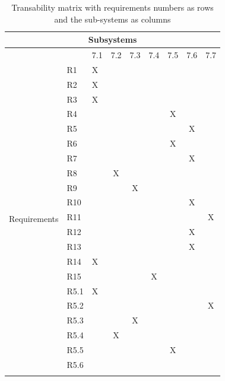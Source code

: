 \documentclass[hidelinks, 12pt, a4paper]{article}
\begin{document}
\begin{table}[H]
    \centering
        \begin{tabular}{|l|l|l|c|c|c|c|c|c|}
        \hline
    
            \multicolumn{9}{|c|}{Subsystems} \\ \hline
            &      & 7.1  & 7.2   & 7.3 & 7.4 & 7.5 & 7.6  &7.7 \\ \hline
        \multirow{22}{*}{Requirements}
        & R1    &   X   &       &      &    &      &   &    \\ \cline{2-9} 
        & R2    &   X   &       &      &    &      &   &    \\ \cline{2-9} 
        & R3    &   X   &       &      &    &      &   &    \\ \cline{2-9} 
        & R4    &       &       &      &    &   X  &   &     \\ \cline{2-9}
        & R5    &       &       &      &    &      & X &    \\ \cline{2-9}
        & R6    &       &       &      &    &   X  &   &    \\ \cline{2-9}
        & R7    &       &       &      &    &      & X &    \\ \cline{2-9}
        & R8    &       &   X   &      &    &      &   &    \\ \cline{2-9}
        & R9    &       &       &   X  &    &      &   &    \\ \cline{2-9}
        & R10   &       &       &      &    &      & X &    \\ \cline{2-9}
        & R11   &       &       &      &    &      &   &  X  \\ \cline{2-9}
        & R12   &       &       &      &    &      & X &     \\ \cline{2-9}
        & R13   &       &       &      &    &      & X &     \\ \cline{2-9}
        & R14   &   X   &       &      &    &      &   &    \\ \cline{2-9}
        & R15   &       &       &      &  X &      &   &    \\ \cline{2-9}
        & R5.1  &   X   &       &      &    &      &   &    \\ \cline{2-9}
        & R5.2  &       &       &      &    &      &   &  X  \\ \cline{2-9}
        & R5.3  &       &       &  X   &    &      &   &    \\ \cline{2-9}
        & R5.4  &       &   X   &      &    &      &   &    \\ \cline{2-9}
        & R5.5  &       &       &      &    &   X  &   &    \\ \cline{2-9}
        & R5.6  &       &       &      &    &      &   &    \\ \cline{1-9}
                                    
        \end{tabular}
        \vspace{1cm}
    \caption{Transability matrix with requirements numbers as rows and the sub-systems as columns}
    \label{table:Could-haveRequirementsTraceabilityMatrix}
\end{table}
\end{document}
